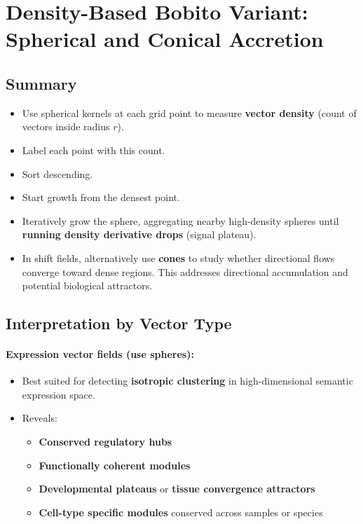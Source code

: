 \documentclass{article}
\begin{document}
\section{Density-Based Bobito Variant: Spherical and Conical Accretion}

\subsection{Summary}
\begin{itemize}
  \item Use spherical kernels at each grid point to measure \textbf{vector density} (count of vectors inside radius $r$).
  \item Label each point with this count.
  \item Sort descending.
  \item Start growth from the densest point.
  \item Iteratively grow the sphere, aggregating nearby high-density spheres until \textbf{running density derivative drops} (signal plateau).
  \item In shift fields, alternatively use \textbf{cones} to study whether directional flows converge toward dense regions. This addresses directional accumulation and potential biological attractors.
\end{itemize}

\subsection{Interpretation by Vector Type}
\paragraph{Expression vector fields (use spheres):}
\begin{itemize}
  \item Best suited for detecting \textbf{isotropic clustering} in high-dimensional semantic expression space.
  \item Reveals:
    \begin{itemize}
      \item \textbf{Conserved regulatory hubs}
      \item \textbf{Functionally coherent modules}
      \item \textbf{Developmental plateaus} or \textbf{tissue convergence attractors}
      \item \textbf{Cell-type specific modules} conserved across samples or species
    \end{itemize}
\end{itemize}
\end{document}
